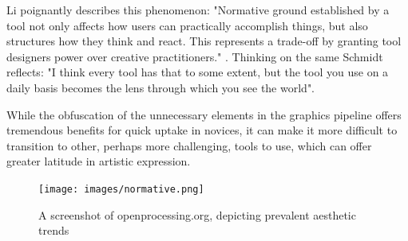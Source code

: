 Li poignantly describes this phenomenon: "Normative ground established by a tool not only affects how users can practically accomplish things, but also structures how they think and react. This represents a trade-off by granting tool designers power over creative practitioners." \parencite[65]{liRethinkingPowerDynamics2023}. Thinking on the same Schmidt reflects:  "I think every tool has that to some extent, but the tool you use on a daily basis becomes the lens through which you see the world".

While the obfuscation of the unnecessary elements in the graphics pipeline offers tremendous benefits for quick uptake in novices, it can make it more difficult to transition to other, perhaps more challenging, tools to use, which can offer greater latitude in artistic expression. 



\clearpage

\begin{figure}
    \centering
    \texttt{[image: images/normative.png]}
    \caption[Openprocessing screenshot]{A screenshot of openprocessing.org, depicting  prevalent aesthetic trends}
    \label{fig:normative}
\end{figure}
